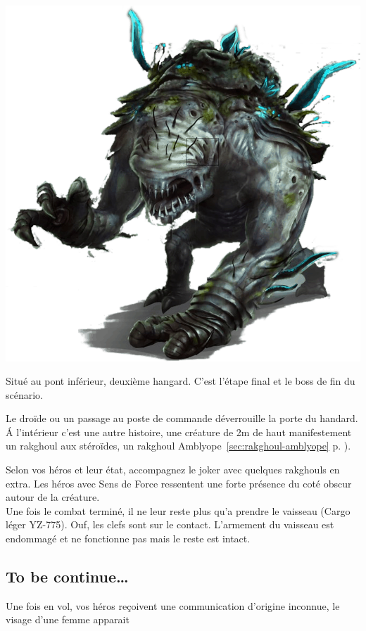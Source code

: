 \documentclass{jdrp}
\begin{document}
\noindent\includegraphics[width=\linewidth]{img/scenario/rakghoul-amblyope.png}

Situé au pont inférieur, deuxième hangard. C'est l'étape final et le boss de fin du scénario.

Le droïde ou un passage au poste de commande déverrouille la porte du handard. \'A l'intérieur c'est une autre histoire, une créature de 2m de haut manifestement un rakghoul aux stéroïdes, un rakghoul Amblyope~\ref{sec:rakghoul-amblyope} p. \pageref{sec:rakghoul-amblyope}).

Selon vos héros et leur état, accompagnez le joker avec quelques rakghouls en extra. Les héros avec Sens de Force ressentent une forte présence du coté obscur autour de la créature.\\

Une fois le combat terminé, il ne leur reste plus qu'a prendre le vaisseau (Cargo léger YZ-775). Ouf, les clefs sont sur le contact. L'armement du vaisseau est endommagé et ne fonctionne pas mais le reste est intact.

\subsection{To be continue\ldots}
Une fois en vol, vos héros reçoivent une communication d'origine inconnue, le visage d'une femme apparait
\end{document}
